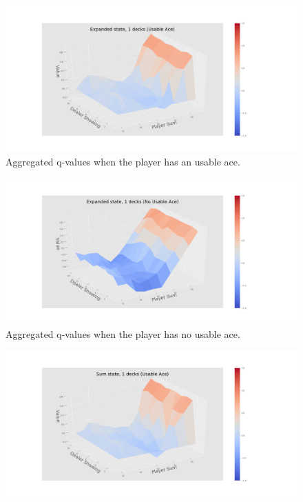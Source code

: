 \begin{center}
\begin{figure}[htp]
  	 \includegraphics[width=1.2\textwidth]{./figures/ace_3D_exp_1_decks.png}
   \caption{Aggregated q-values when the player has an usable ace.\label{sfig:3Dnd1}}
\end{figure}
 \begin{figure}[htp]%
  	 \includegraphics[width=1.2\textwidth]{./figures/noace_3D_exp_1_decks.png}
   \caption{Aggregated q-values when the player has no usable ace.\label{sfig:3Dnd2}}
 \end{figure}
 \begin{figure}[htp]%
  	 \includegraphics[width=1.2\textwidth]{./figures/ace_3D_sum_1_decks.png}

\end{figure}
\end{center}
